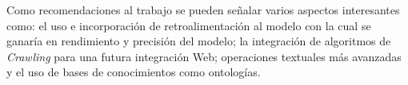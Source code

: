 Como recomendaciones al trabajo se pueden señalar varios aspectos interesantes
como: el uso e incorporación de retroalimentación al modelo con la cual se
ganaría en rendimiento y precisión del modelo; la integración de algoritmos de
\emph{Crawling} para una futura integración Web; operaciones textuales más
avanzadas y el uso de bases de conocimientos como ontologías.
